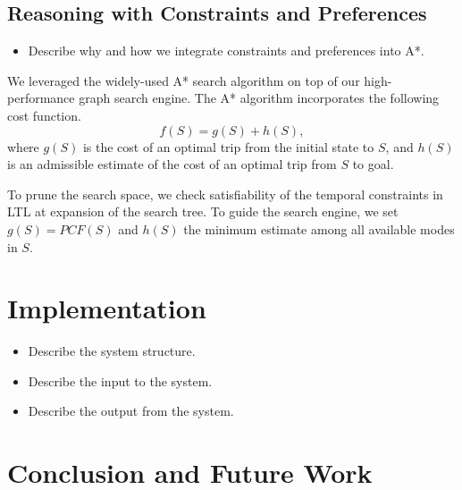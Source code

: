\documentclass[letterpaper]{article}
\newcommand{\PCF}{\mathit{PCF}}
\begin{document}
\subsection{Reasoning with Constraints and Preferences}
\begin{itemize}
	\setlength\itemsep{1pt}
	\item Describe why and how we integrate constraints and preferences into A*.
\end{itemize}

We leveraged the widely-used A* search algorithm on top of our high-performance graph search
engine.  The A* algorithm incorporates the following cost function.
\begin{equation}
	f(S) = g(S) + h(S),
\end{equation}
where $g(S)$ is the cost of an optimal trip from the initial state to $S$, and
$h(S)$ is an admissible estimate of the cost of an optimal trip from $S$ to goal.

To prune the search space, we check satisfiability of the temporal constraints in LTL
at expansion of the search tree.
To guide the search engine, we set $g(S)=\PCF(S)$ and $h(S)$ the minimum estimate among
all available modes in $S$.


\section{Implementation}

\begin{itemize}
	\setlength\itemsep{1pt}
	\item Describe the system structure.
	\item Describe the input to the system.
	\item Describe the output from the system.
\end{itemize}



\section{Conclusion and Future Work}




\end{document}
